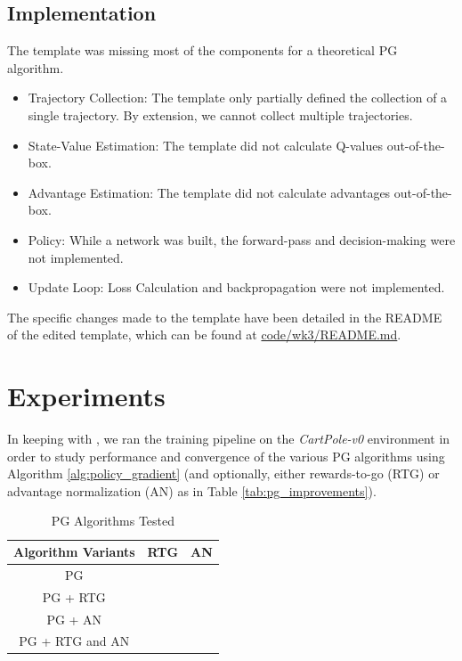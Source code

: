 \documentclass{article} %
\newcommand{\cmark}{\ding{51}}%
\newcommand{\xmark}{\ding{55}}%
\begin{document}
\subsection{Implementation}
The template was missing most of the components 
for a theoretical PG algorithm.
\begin{itemize}
    \item Trajectory Collection: The template only partially defined the collection of a single trajectory.
    By extension, we cannot collect multiple trajectories.
    \item State-Value Estimation: The template did not calculate Q-values out-of-the-box.
    \item Advantage Estimation: The template did not calculate advantages out-of-the-box.
    \item Policy: While a network was built, the forward-pass and decision-making
    were not implemented.
    \item Update Loop: Loss Calculation and backpropagation were not implemented.
\end{itemize}

The specific changes made to the template have been detailed in the README
of the edited template, which can be found at \href{code/wk3/README.md}{code/wk3/README.md}.

\section{Experiments} 
In keeping with \cite{Levine-et-al-2023}, we ran the training pipeline on the \textit{CartPole-v0} environment
in order to study performance and convergence of the various PG algorithms
using Algorithm \ref{alg:policy_gradient} (and optionally, either rewards-to-go (RTG) 
or advantage normalization (AN) as in Table \ref{tab:pg_improvements}).

\begin{table}[h]
    \centering
    \begin{tabular}{ccc}
        \toprule
        Algorithm Variants & RTG & AN \\
        \midrule
        PG & \xmark & \xmark \\
        PG + RTG & \cmark & \xmark \\
        PG + AN & \xmark & \cmark \\
        PG + RTG and AN & \cmark & \cmark \\
        \bottomrule
    \end{tabular}
    \caption{PG Algorithms Tested}
    \label{tab:pg_algorithms}
\end{table}
\end{document}
